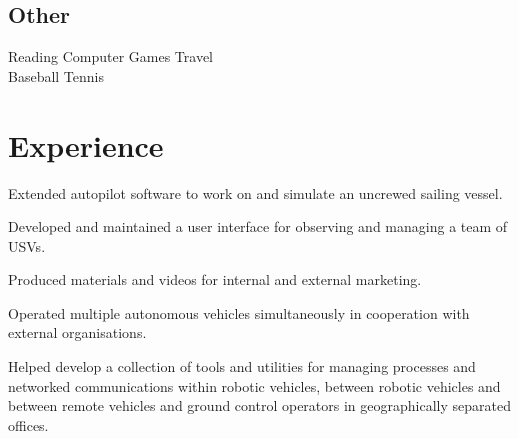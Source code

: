\documentclass[a4paper]{awesome-deedy}
\begin{document}
\begin{minipage}[t]{0.33\textwidth}
\subsection{Other}
\begin{center}
Reading \textbullet{} Computer Games \textbullet{} Travel \\
Baseball \textbullet{} Tennis \textbullet{} %
\end{center}
\sectionsep

%
%

\end{minipage} 
\hfill
\begin{minipage}[t]{0.66\textwidth} 


\section{Experience}

\vspace{\topsep} %
\begin{tightemize}
\item Extended autopilot software to work on and simulate an uncrewed sailing vessel.
\item Developed and maintained a user interface for observing and managing a team of USVs.
\item Produced materials and videos for internal and external marketing.
\item Operated multiple autonomous vehicles simultaneously in cooperation with external organisations.
\item Helped develop a collection of tools and utilities for managing processes and networked communications within robotic vehicles, between robotic vehicles and between remote vehicles and ground control operators in geographically separated offices.
\end{tightemize}
\sectionsep


\end{minipage}
\end{document}
